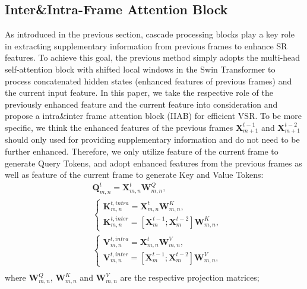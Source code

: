 \documentclass[10pt,twocolumn,letterpaper]{article}
\begin{document}
\subsection{Inter\&Intra-Frame Attention Block}
\label{sec:iiab}
As introduced in the previous section, cascade processing blocks play a key role in extracting supplementary information from previous frames to enhance SR features.
%
To achieve this goal, the previous method \cite{liang2022recurrent,shi2022rethinking} simply adopts the multi-head self-attention block with shifted local windows in the Swin Transformer to process concatenated hidden states (enhanced features of previous frames) and the current input feature. 
%
In this paper, we take the respective role of the previously enhanced feature and the current feature into consideration and 
propose a intra\&inter frame attention block (IIAB) for efficient VSR.
%
%
To be more specific, we think the enhanced features of the previous frames $\bm{X}_{m+1}^{t-1}$ and $ \bm{X}_{m+1}^{t-2}$ should only used for providing supplementary information and do not need to be further enhanced.
%
Therefore, we only utilize feature of the current frame to generate Query Tokens, and adopt enhanced features from the previous frames as well as feature of the current frame to generate Key and Value Tokens:
\begin{equation}
\label{eq:QKV}
    \begin{aligned}
    &\bm{Q}_{m,n}^{t} = \bm{X}_{m,n}^{t}\bm{W}^Q_{m,n},\\
    &\left\{
        \begin{array}{l}
        \bm{K}_{m,n}^{t,intra} =  \bm{X}_{m,n}^{t}\bm{W}^K_{m,n},\\
        \bm{K}_{m,n}^{t,inter} = \left[\bm{X}_{m}^{t-1}; \bm{X}_{m}^{t-2}\right]\bm{W}^K_{m,n},

        \end{array}
    \right.\\
    &\left\{
        \begin{array}{l}
        \bm{V}_{m,n}^{t, intra} =  \bm{X}_{m,n}^{t}\bm{W}^V_{m,n},\\
        \bm{V}_{m,n}^{t, inter} = \left[\bm{X}_{m}^{t-1}; \bm{X}_{m}^{t-2}\right]\bm{W}^V_{m,n},

        \end{array}
     \right.\\
     \end{aligned}
\end{equation}
where $\bm{W}^Q_{m,n}$, $\bm{W}^K_{m,n}$ and $\bm{W}^V_{m,n}$ are the respective projection matrices; 
\end{document}
